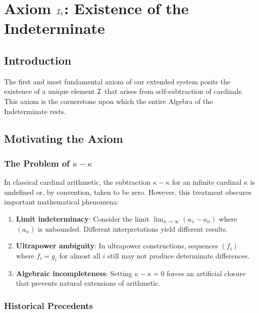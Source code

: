 \chapter{Axiom $\mathcal{I}_1$: Existence of the Indeterminate}
\label{ch:axiom-I1}

\section{Introduction}

The first and most fundamental axiom of our extended system posits the existence of a unique element $\mathcal{I}$ that arises from self-subtraction of cardinals. This axiom is the cornerstone upon which the entire Algebra of the Indeterminate rests.

\section{Motivating the Axiom}

\subsection{The Problem of $\kappa - \kappa$}

In classical cardinal arithmetic, the subtraction $\kappa - \kappa$ for an infinite cardinal $\kappa$ is undefined or, by convention, taken to be zero. However, this treatment obscures important mathematical phenomena:

\begin{enumerate}
    \item \textbf{Limit indeterminacy}: Consider the limit $\lim_{n \to \infty} (a_n - a_n)$ where $(a_n)$ is unbounded. Different interpretations yield different results.
    
    \item \textbf{Ultrapower ambiguity}: In ultrapower constructions, sequences $(f_i)$ where $f_i = g_i$ for almost all $i$ still may not produce determinate differences.
    
    \item \textbf{Algebraic incompleteness}: Setting $\kappa - \kappa = 0$ forces an artificial closure that prevents natural extensions of arithmetic.
\end{enumerate}

\subsection{Historical Precedents}

